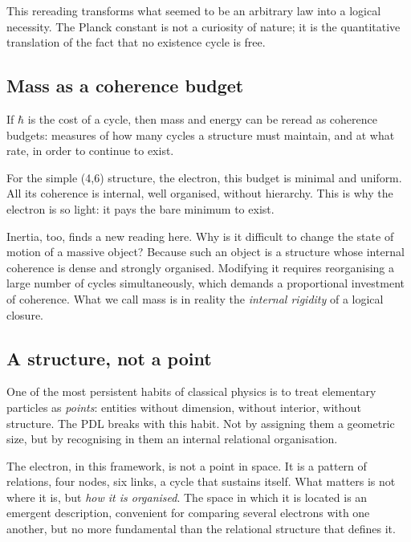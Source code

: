 \documentclass[12pt, a4paper, openright]{book}
\begin{document}
\medskip

This rereading transforms what seemed to be an arbitrary law into a logical necessity. The Planck constant is not a curiosity of nature; it is the quantitative translation of the fact that no existence cycle is free.

\subsection*{Mass as a coherence budget}

If $\hbar$ is the cost of a cycle, then mass and energy can be reread as coherence budgets: measures of how many cycles a structure must maintain, and at what rate, in order to continue to exist.

\medskip

For the simple (4,6) structure, the electron, this budget is minimal and uniform. All its coherence is internal, well organised, without hierarchy. This is why the electron is so light: it pays the bare minimum to exist.

\medskip

Inertia, too, finds a new reading here. Why is it difficult to change the state of motion of a massive object? Because such an object is a structure whose internal coherence is dense and strongly organised. Modifying it requires reorganising a large number of cycles simultaneously, which demands a proportional investment of coherence. What we call mass is in reality the \emph{internal rigidity} of a logical closure.

\subsection*{A structure, not a point}

One of the most persistent habits of classical physics is to treat elementary particles as \emph{points}: entities without dimension, without interior, without structure. The PDL breaks with this habit. Not by assigning them a geometric size, but by recognising in them an internal relational organisation.

\medskip

The electron, in this framework, is not a point in space. It is a pattern of relations, four nodes, six links, a cycle that sustains itself. What matters is not where it is, but \emph{how it is organised}. The space in which it is located is an emergent description, convenient for comparing several electrons with one another, but no more fundamental than the relational structure that defines it.
\end{document}
